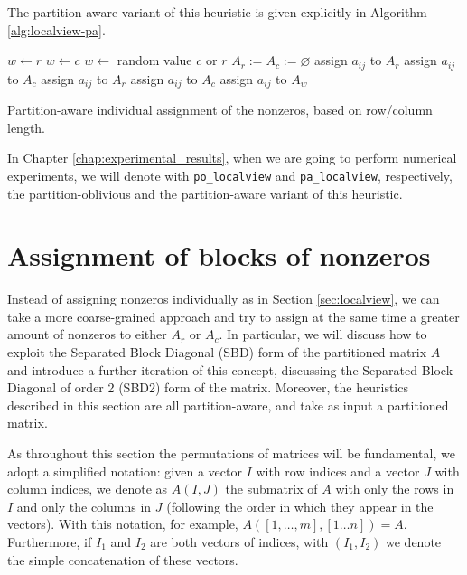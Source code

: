 The partition aware variant of this heuristic is given explicitly in Algorithm \ref{alg:localview-pa}.

\begin{algorithm}[h]
	\begin{algorithmic}
		\State
		\State $w \gets r$ 
		\State $w \gets c$
		\Else
		\State $w \gets$ random value $c$ or $r$
		\EndIf
		\State $A_r := A_c := \varnothing$
		\State assign $a_{ij}$ to $A_r$
		\State assign $a_{ij}$ to $A_c$
		\Else
		\State assign $a_{ij}$ to $A_r$
		\State assign $a_{ij}$ to $A_c$
		\Else
		\State assign $a_{ij}$ to $A_w$
		\EndIf
		\EndIf
		\EndFor
	\end{algorithmic}
	\caption{Partition-aware individual assignment of the nonzeros, based on row/column length.} \label{alg:localview-pa}
\end{algorithm}

In Chapter \ref{chap:experimental_results}, when we are going to perform numerical experiments, we will denote with \verb|po_localview| and \verb|pa_localview|, respectively, the partition-oblivious and the partition-aware variant of this heuristic. 

\section{Assignment of blocks of nonzeros} \label{sec:sbd}

Instead of assigning nonzeros individually as in Section \ref{sec:localview}, we can take a more coarse-grained approach and try to assign at the same time a greater amount of nonzeros to either $A_r$ or $A_c$. In particular, we will discuss how to exploit the Separated Block Diagonal (SBD) form of the partitioned matrix $A$ and introduce a further iteration of this concept, discussing the Separated Block Diagonal of order 2 (SBD2) form of the matrix. Moreover, the heuristics described in this section are all partition-aware, and take as input a partitioned matrix.

As throughout this section the permutations of matrices will be fundamental, we adopt a simplified notation: given a vector $I$ with row indices and a vector $J$ with column indices, we denote as $A(I,J)$ the submatrix of $A$ with only the rows in $I$ and only the columns in $J$ (following the order in which they appear in the vectors). With this notation, for example, $A([1,\dots,m],[1 \dots n]) = A$. Furthermore, if $I_1$ and $I_2$ are both vectors of indices, with $(I_1,I_2)$ we denote the simple concatenation of these vectors.

